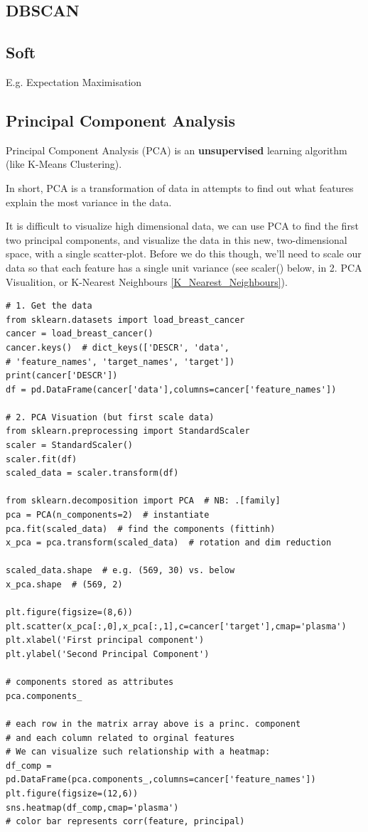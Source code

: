 \documentclass[11pt]{article}
\begin{document}
\subsection{DBSCAN}

\subsection{Soft}
E.g. Expectation Maximisation 

\subsection{Principal Component Analysis}
Principal Component Analysis (PCA) is an \textbf{unsupervised} learning algorithm (like K-Means Clustering).

In short, PCA is a transformation of data in attempts to find out what features explain the most variance in the data.

It is difficult to visualize high dimensional data, we can use PCA to find the first two principal components, and visualize the data in this new, two-dimensional space, with a single scatter-plot. Before we do this though, we'll need to scale our data so that each feature has a single unit variance (see scaler() below, in 2. PCA Visualition, or K-Nearest Neighbours \ref{K_Nearest_Neighbours}).

\begin{lstlisting}
# 1. Get the data
from sklearn.datasets import load_breast_cancer
cancer = load_breast_cancer()
cancer.keys()  # dict_keys(['DESCR', 'data', 
# 'feature_names', 'target_names', 'target'])
print(cancer['DESCR'])
df = pd.DataFrame(cancer['data'],columns=cancer['feature_names'])

# 2. PCA Visuation (but first scale data)
from sklearn.preprocessing import StandardScaler
scaler = StandardScaler() 
scaler.fit(df)
scaled_data = scaler.transform(df)

from sklearn.decomposition import PCA  # NB: .[family]
pca = PCA(n_components=2)  # instantiate
pca.fit(scaled_data)  # find the components (fittinh)
x_pca = pca.transform(scaled_data)  # rotation and dim reduction

scaled_data.shape  # e.g. (569, 30) vs. below
x_pca.shape  # (569, 2)  

plt.figure(figsize=(8,6))
plt.scatter(x_pca[:,0],x_pca[:,1],c=cancer['target'],cmap='plasma')
plt.xlabel('First principal component')
plt.ylabel('Second Principal Component')

# components stored as attributes
pca.components_

# each row in the matrix array above is a princ. component
# and each column related to orginal features
# We can visualize such relationship with a heatmap:
df_comp = pd.DataFrame(pca.components_,columns=cancer['feature_names'])
plt.figure(figsize=(12,6))
sns.heatmap(df_comp,cmap='plasma')
# color bar represents corr(feature, principal)
\end{lstlisting}
\end{document}
